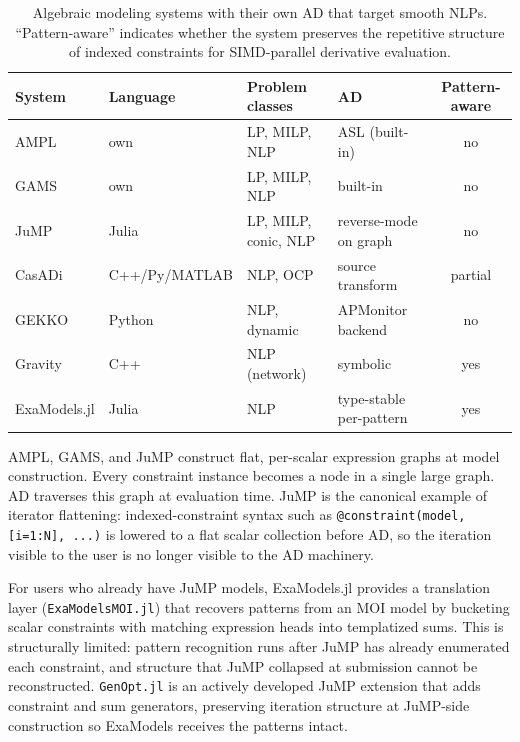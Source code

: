 \documentclass[11pt]{article}
\begin{document}
\begin{table}[t]
  \centering
  \caption{Algebraic modeling systems with their own AD that target smooth NLPs. ``Pattern-aware'' indicates whether the system preserves the repetitive structure of indexed constraints for SIMD-parallel derivative evaluation.}
  \label{tab:ams}
  \small
  \setlength{\tabcolsep}{4pt}
  \begin{tabular}{l l l l c}
    \toprule
    System & Language & Problem classes & AD & Pattern-aware \\
    \midrule
    AMPL         & own           & LP, MILP, NLP        & ASL (built-in)            & no \\
    GAMS         & own           & LP, MILP, NLP        & built-in                  & no \\
    JuMP         & Julia         & LP, MILP, conic, NLP & reverse-mode on graph     & no \\
    CasADi       & C++/Py/MATLAB & NLP, OCP             & source transform          & partial \\
    GEKKO        & Python        & NLP, dynamic         & APMonitor backend         & no \\
    Gravity      & C++           & NLP (network)        & symbolic                  & yes \\
    \midrule
    ExaModels.jl & Julia         & NLP                  & type-stable per-pattern   & yes \\
    \bottomrule
  \end{tabular}
\end{table}

AMPL, GAMS, and JuMP construct flat, per-scalar expression graphs at model construction. Every constraint instance becomes a node in a single large graph. AD traverses this graph at evaluation time. JuMP is the canonical example of iterator flattening: indexed-constraint syntax such as \texttt{@constraint(model, [i=1:N], ...)} is lowered to a flat scalar collection before AD, so the iteration visible to the user is no longer visible to the AD machinery.

For users who already have JuMP models, ExaModels.jl provides a translation layer (\texttt{ExaModelsMOI.jl}) that recovers patterns from an MOI model by bucketing scalar constraints with matching expression heads into templatized sums. This is structurally limited: pattern recognition runs after JuMP has already enumerated each constraint, and structure that JuMP collapsed at submission cannot be reconstructed. \texttt{GenOpt.jl} \citep{legatGenOptJl2025} is an actively developed JuMP extension that adds constraint and sum generators, preserving iteration structure at JuMP-side construction so ExaModels receives the patterns intact.
\end{document}
